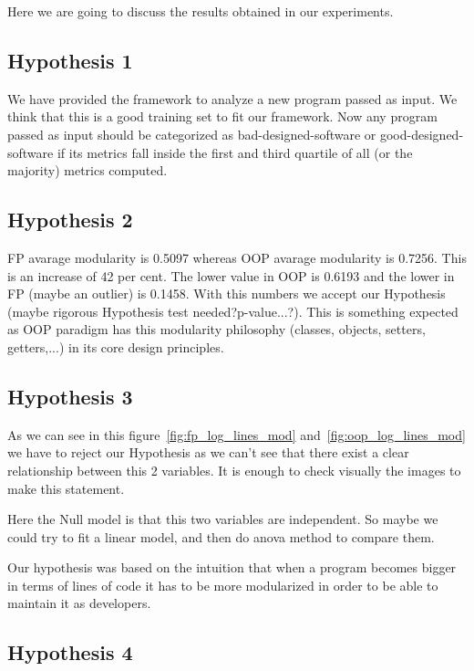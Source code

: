 \documentclass[12pt, a4paper]{article}
\begin{document}
Here we are going to discuss the results obtained in our experiments.

\subsection{Hypothesis 1}

We have provided the framework to analyze a new program passed as input. We think that this is a good training set to fit our framework. Now any program passed as input should be categorized as bad-designed-software or good-designed-software if its metrics fall inside the first and third quartile of all (or the majority) metrics computed.

\subsection{Hypothesis 2}

FP avarage modularity is 0.5097 whereas OOP avarage modularity is 0.7256. This is an increase of 42 per cent. The lower value in OOP is 0.6193 and the lower in FP (maybe an outlier) is 0.1458. With this numbers we accept our Hypothesis (maybe rigorous Hypothesis test needed?p-value...?). This is something expected as OOP paradigm has this modularity philosophy (classes, objects, setters, getters,...) in its core design principles. 

\subsection{Hypothesis 3}

As we can see in this figure~\ref{fig:fp_log_lines_mod} and~\ref{fig:oop_log_lines_mod} we have to reject our Hypothesis as we can't see that there exist a clear relationship between this 2 variables. It is enough to check visually the images to make this statement.

Here the Null model is that this two variables are independent. So maybe we could try to fit a linear model, and then do anova method to compare them.

Our hypothesis was based on the intuition that when a program becomes bigger in terms of lines of code it has to be more modularized in order to be able to maintain it as developers.

\subsection{Hypothesis 4}
\end{document}
